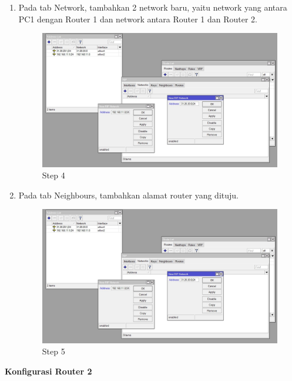 \begin{enumerate}
	\item Pada tab Network, tambahkan 2 network baru, yaitu network yang antara PC1 dengan Router
	1 dan network antara Router 1 dan Router 2.	
	\begin{figure}[H]
		\centering
		\includegraphics[width=0.5\linewidth]{P2/img/dinamis_R1step3.2.jpg}
		\caption{Step 4}
		\label{fig:gambar38}
	\end{figure}

	\item Pada tab Neighbours, tambahkan alamat router yang dituju.
	\begin{figure}[H]
		\centering
		\includegraphics[width=0.5\linewidth]{P2/img/dinamis_R1step3.2.jpg}
		\caption{Step 5}
		\label{fig:gambar38}
	\end{figure}

\end{enumerate}

\begin{center} 
	\textbf{Konfigurasi Router 2}
\end{center}

